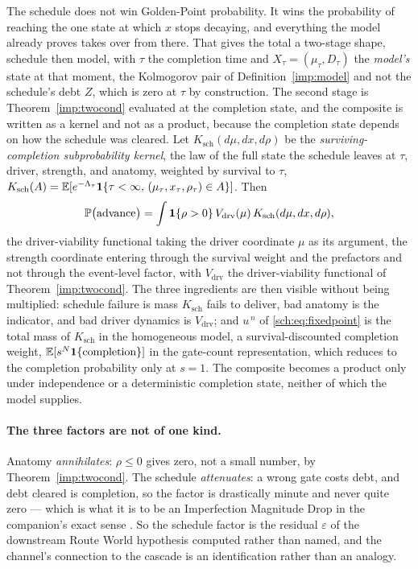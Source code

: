 The schedule does not win Golden-Point probability. It wins the
probability of reaching the one state at which $x$ stops decaying, and
everything the model already proves takes over from there. That gives
the total a two-stage shape, schedule then model, with $\tau$ the
completion time and $X_\tau=(\mu_\tau,D_\tau)$ the \emph{model's} state
at that moment, the Kolmogorov pair of Definition~\ref{imp:model}
and not the schedule's debt $Z$, which is zero at $\tau$ by
construction.\label{sch:eq:composite} The second stage is
Theorem~\ref{imp:twocond} evaluated at the completion state, and the
composite is written as a kernel and not as a product, because the
completion state depends on how the schedule was cleared. Let $K_{\mathrm{sch}}(d\mu,dx,d\rho)$ be the \emph{surviving-completion
subprobability kernel}, the law of the full state the schedule leaves
at $\tau$, driver, strength, and anatomy, weighted by survival to
$\tau$,
$K_{\mathrm{sch}}(A)=\mathbb{E}[e^{-\Lambda_\tau}\mathbf{1}\{\tau<\infty,\,(\mu_\tau,x_\tau,\rho_\tau)\in A\}]$.
Then
\begin{equation}\label{sch:eq:threecond}
\mathbb{P}\bigl(\text{advance}\bigr)
=\int\mathbf{1}\{\rho>0\}\,V_{\mathrm{drv}}(\mu)\,K_{\mathrm{sch}}(d\mu,dx,d\rho),
\end{equation}
the driver-viability functional taking the driver coordinate $\mu$ as
its argument, the strength coordinate entering through the survival
weight and the prefactors and not through the event-level factor,
with $V_{\mathrm{drv}}$ the driver-viability functional of
Theorem~\ref{imp:twocond}. The three ingredients are then visible without
being multiplied: schedule failure is mass $K_{\mathrm{sch}}$ fails to
deliver, bad anatomy is the indicator, and bad driver dynamics is
$V_{\mathrm{drv}}$; and $u^{\,n}$ of \eqref{sch:eq:fixedpoint} is the
total mass of $K_{\mathrm{sch}}$ in the homogeneous model, a
survival-discounted completion weight, $\mathbb{E}[s^N\mathbf{1}\{\text{completion}\}]$
in the gate-count representation, which reduces to the completion
probability only at $s=1$. The composite becomes a product only under
independence or a deterministic completion state, neither of which the
model supplies.

\paragraph{The three factors are not of one kind.}\label{sch:rem:threefactor}
Anatomy \emph{annihilates}: $\rho\le0$ gives zero, not a small number,
by Theorem~\ref{imp:twocond}. The schedule \emph{attenuates}: a
wrong gate costs debt, and debt cleared is completion, so the factor is
drastically minute and never quite zero --- which is what it is to be an
Imperfection Magnitude Drop in the companion's exact sense \cite{Nexus}.
So the schedule factor is the residual $\varepsilon$ of
the downstream Route World hypothesis computed rather than named, and the
channel's connection to the cascade is an identification rather than an
analogy.

